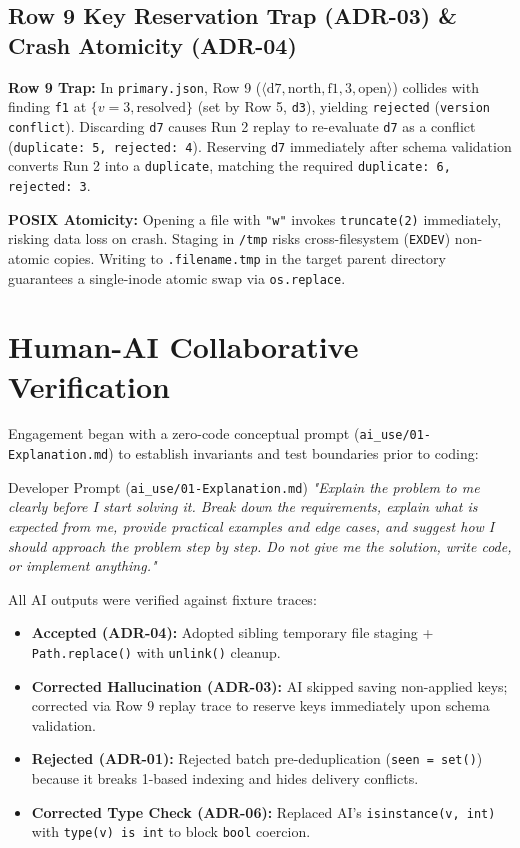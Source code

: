 \documentclass[10pt,a4paper]{article}
\begin{document}
\subsection{Row 9 Key Reservation Trap (ADR-03) \& Crash Atomicity (ADR-04)}
\textbf{Row 9 Trap:} In \texttt{primary.json}, Row 9 ($\langle \text{d7}, \text{north}, \text{f1}, 3, \text{open} \rangle$) collides with finding \texttt{f1} at $\{v=3, \text{resolved}\}$ (set by Row 5, \texttt{d3}), yielding \texttt{rejected} (\texttt{version conflict}). Discarding \texttt{d7} causes Run 2 replay to re-evaluate \texttt{d7} as a conflict (\texttt{duplicate: 5, rejected: 4}). Reserving \texttt{d7} immediately after schema validation converts Run 2 into a \texttt{duplicate}, matching the required \texttt{duplicate: 6, rejected: 3}.

\textbf{POSIX Atomicity:} Opening a file with \texttt{"w"} invokes \texttt{truncate(2)} immediately, risking data loss on crash. Staging in \texttt{/tmp} risks cross-filesystem (\texttt{EXDEV}) non-atomic copies. Writing to \texttt{.filename.tmp} in the target parent directory guarantees a single-inode atomic swap via \texttt{os.replace}.

\section{Human-AI Collaborative Verification}

Engagement began with a zero-code conceptual prompt (\texttt{ai\_use/01-Explanation.md}) to establish invariants and test boundaries prior to coding:
\begin{calloutbox}{Developer Prompt (\texttt{ai\_use/01-Explanation.md})}
\footnotesize\textit{"Explain the problem to me clearly before I start solving it. Break down the requirements, explain what is expected from me, provide practical examples and edge cases, and suggest how I should approach the problem step by step. Do not give me the solution, write code, or implement anything."}
\end{calloutbox}

All AI outputs were verified against fixture traces:
\begin{itemize}[leftmargin=1.5em, noitemsep, topsep=2pt]
    \item \textbf{Accepted (ADR-04):} Adopted sibling temporary file staging + \texttt{Path.replace()} with \texttt{unlink()} cleanup.
    \item \textbf{Corrected Hallucination (ADR-03):} AI skipped saving non-applied keys; corrected via Row 9 replay trace to reserve keys immediately upon schema validation.
    \item \textbf{Rejected (ADR-01):} Rejected batch pre-deduplication (\texttt{seen = set()}) because it breaks 1-based indexing and hides delivery conflicts.
    \item \textbf{Corrected Type Check (ADR-06):} Replaced AI's \texttt{isinstance(v, int)} with \texttt{type(v) is int} to block \texttt{bool} coercion.
\end{itemize}
\end{document}
